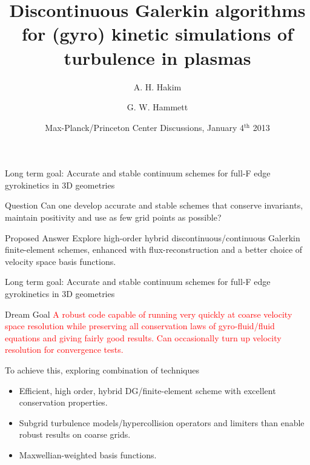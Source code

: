 \documentclass[pdf]{beamer}
\title[Continuum Discontinuous Galerkin Algorithms]{Discontinuous
  Galerkin algorithms for (gyro) kinetic simulations of turbulence in
  plasmas}%
\author{A. H. Hakim \and G. W. Hammett}%
\institute[http://www.ammar-hakim.org/sj] %
{
  Princeton Plasma Physics Laboratory, Princeton, NJ\\
  ammar@princeton.edu\\
  \url{http://www.ammar-hakim.org/sj}
}
\date[MPI/PU/PPPL]{Max-Planck/Princeton Center Discussions, January
  4$^\mathrm{th}$ 2013}
\newcommand{\mypause}{}
\theoremstyle{definition}
\begin{document}
\begin{frame}
  \titlepage
\end{frame}

\begin{frame}{Long term goal: Accurate and stable continuum schemes
    for full-F edge gyrokinetics in 3D geometries}

  \begin{block}{Question}
    \small
    Can one develop accurate and stable schemes that conserve
    invariants, maintain positivity and use as few grid points as
    possible?
  \end{block}
  \mypause
  \begin{block}{Proposed Answer}
    \small Explore high-order hybrid discontinuous/continuous Galerkin
    finite-element schemes, enhanced with flux-reconstruction and a
    better choice of velocity space basis functions.
  \end{block}

\end{frame}

\begin{frame}{Long term goal: Accurate and stable continuum schemes
    for full-F edge gyrokinetics in 3D geometries}

  \begin{block}{Dream Goal}
    \textcolor{red}{A robust code capable of running very quickly at
      coarse velocity space resolution while preserving all
      conservation laws of gyro-fluid/fluid equations and giving
      fairly good results. Can occasionally turn up velocity
      resolution for convergence tests.}
  \end{block}
  \mypause
  To achieve this, exploring combination of techniques
  \begin{itemize}
  \item Efficient, high order, hybrid DG/finite-element scheme with
    excellent conservation properties.
  \item Subgrid turbulence models/hypercollision operators and
    limiters than enable robust results on coarse grids.
  \item Maxwellian-weighted basis functions.
  \end{itemize}

\end{frame}
\end{document}
